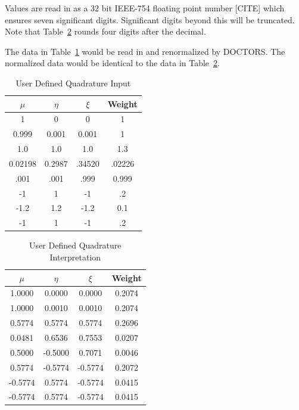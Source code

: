 Values are read in as a 32 bit IEEE-754 floating point number [CITE] which ensures seven significant digits. Significant digits beyond this will be truncated. Note that Table~\ref{tab:quad_interp} rounds four digits after the decimal.

The data in Table~\ref{tab:quad_format} would be read in and renormalized by DOCTORS. The normalized data would be identical to the data in Table~\ref{tab:quad_interp}.

\begin{table}[ht]
\caption{User Defined Quadrature Input}
\centering 
\begin{tabular}{c c c c}
\hline \hline   
$\mu$    & $\eta$ & $\xi$ & Weight\\ [0.5ex] 
\hline
1        & 0      & 0      & 1 \\
0.999    & 0.001  & 0.001  & 1 \\
1.0      & 1.0    & 1.0    & 1.3 \\
0.02198  & 0.2987 & .34520 & .02226 \\
.001     & .001   & .999   & 0.999 \\
-1       & 1      & -1     & .2 \\
-1.2     & 1.2    & -1.2   & 0.1 \\
-1        & 1     & -1     & .2 \\ [1ex]
\hline
\end{tabular}
\label{tab:quad_format}
\end{table}

\begin{table}[ht]
\caption{User Defined Quadrature Interpretation}
\centering 
\begin{tabular}{c c c c}
\hline \hline   
$\mu$    & $\eta$ & $\xi$ & Weight\\ [0.5ex] 
\hline
 1.0000  &  0.0000  &  0.0000  & 0.2074 \\
 1.0000  &  0.0010  &  0.0010  & 0.2074 \\
 0.5774  &  0.5774  &  0.5774  & 0.2696 \\
 0.0481  &  0.6536  &  0.7553  & 0.0207 \\
 0.5000  & -0.5000  &  0.7071  & 0.0046 \\
 0.5774  & -0.5774  & -0.5774  & 0.2072 \\
-0.5774  &  0.5774  & -0.5774  & 0.0415 \\
-0.5774  &  0.5774  & -0.5774  & 0.0415 \\ [1ex]
\hline
\end{tabular}
\label{tab:quad_interp}
\end{table}

